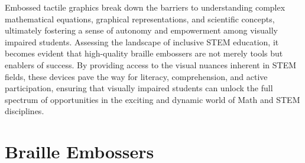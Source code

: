 \documentclass[14pt,letterpaper,twoside]{extreport}
\begin{document}
Embossed tactile graphics break down the barriers to understanding complex mathematical equations, graphical representations, and scientific concepts, ultimately fostering a sense of autonomy and empowerment among visually impaired students. Assessing the landscape of inclusive STEM education, it becomes evident that high-quality braille embossers are not merely tools but enablers of success. By providing access to the visual nuances inherent in STEM fields, these devices pave the way for literacy, comprehension, and active participation, ensuring that visually impaired students can unlock the full spectrum of opportunities in the exciting and dynamic world of Math and STEM disciplines.

\hypertarget{embossers}{%
	\section{Braille Embossers}\label{embossers}}
\end{document}
